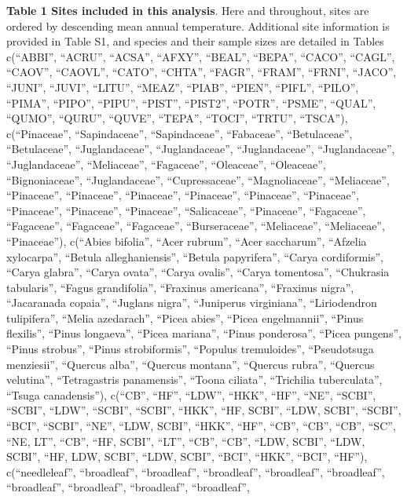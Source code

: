 \documentclass[
]{article}
\begin{document}
\textbf{Table 1 \textbar{} Sites included in this analysis}. Here and
throughout, sites are ordered by descending mean annual temperature.
Additional site information is provided in Table S1, and species and
their sample sizes are detailed in Tables c(``ABBI'', ``ACRU'',
``ACSA'', ``AFXY'', ``BEAL'', ``BEPA'', ``CACO'', ``CAGL'', ``CAOV'',
``CAOVL'', ``CATO'', ``CHTA'', ``FAGR'', ``FRAM'', ``FRNI'', ``JACO'',
``JUNI'', ``JUVI'', ``LITU'', ``MEAZ'', ``PIAB'', ``PIEN'', ``PIFL'',
``PILO'', ``PIMA'', ``PIPO'', ``PIPU'', ``PIST'', ``PIST2'', ``POTR'',
``PSME'', ``QUAL'', ``QUMO'', ``QURU'', ``QUVE'', ``TEPA'', ``TOCI'',
``TRTU'', ``TSCA''), c(``Pinaceae'', ``Sapindaceae'', ``Sapindaceae'',
``Fabaceae'', ``Betulaceae'', ``Betulaceae'', ``Juglandaceae'',
``Juglandaceae'', ``Juglandaceae'', ``Juglandaceae'', ``Juglandaceae'',
``Meliaceae'', ``Fagaceae'', ``Oleaceae'', ``Oleaceae'',
``Bignoniaceae'', ``Juglandaceae'', ``Cupressaceae'', ``Magnoliaceae'',
``Meliaceae'', ``Pinaceae'', ``Pinaceae'', ``Pinaceae'', ``Pinaceae'',
``Pinaceae'', ``Pinaceae'', ``Pinaceae'', ``Pinaceae'', ``Pinaceae'',
``Salicaceae'', ``Pinaceae'', ``Fagaceae'', ``Fagaceae'', ``Fagaceae'',
``Fagaceae'', ``Burseraceae'', ``Meliaceae'', ``Meliaceae'',
``Pinaceae''), c(``Abies bifolia'', ``Acer rubrum'', ``Acer saccharum'',
``Afzelia xylocarpa'', ``Betula alleghaniensis'', ``Betula papyrifera'',
``Carya cordiformis'', ``Carya glabra'', ``Carya ovata'', ``Carya
ovalis'', ``Carya tomentosa'', ``Chukrasia tabularis'', ``Fagus
grandifolia'', ``Fraxinus americana'', ``Fraxinus nigra'', ``Jacaranada
copaia'', ``Juglans nigra'', ``Juniperus virginiana'', ``Liriodendron
tulipifera'', ``Melia azedarach'', ``Picea abies'', ``Picea
engelmannii'', ``Pinus flexilis'', ``Pinus longaeva'', ``Picea
mariana'', ``Pinus ponderosa'', ``Picea pungens'', ``Pinus strobus'',
``Pinus strobiformis'', ``Populus tremuloides'', ``Pseudotsuga
menziesii'', ``Quercus alba'', ``Quercus montana'', ``Quercus rubra'',
``Quercus velutina'', ``Tetragastris panamensis'', ``Toona ciliata'',
``Trichilia tuberculata'', ``Tsuga canadensis''), c(``CB'', ``HF'',
``LDW'', ``HKK'', ``HF'', ``NE'', ``SCBI'', ``SCBI'', ``LDW'', ``SCBI'',
``SCBI'', ``HKK'', ``HF, SCBI'', ``LDW, SCBI'', ``SCBI'', ``BCI'',
``SCBI'', ``NE'', ``LDW, SCBI'', ``HKK'', ``HF'', ``CB'', ``CB'',
``CB'', ``SC'', ``NE, LT'', ``CB'', ``HF, SCBI'', ``LT'', ``CB'',
``CB'', ``LDW, SCBI'', ``LDW, SCBI'', ``HF, LDW, SCBI'', ``LDW, SCBI'',
``BCI'', ``HKK'', ``BCI'', ``HF''), c(``needleleaf'', ``broadleaf'',
``broadleaf'', ``broadleaf'', ``broadleaf'', ``broadleaf'',
``broadleaf'', ``broadleaf'', ``broadleaf'', ``broadleaf'',
\end{document}
